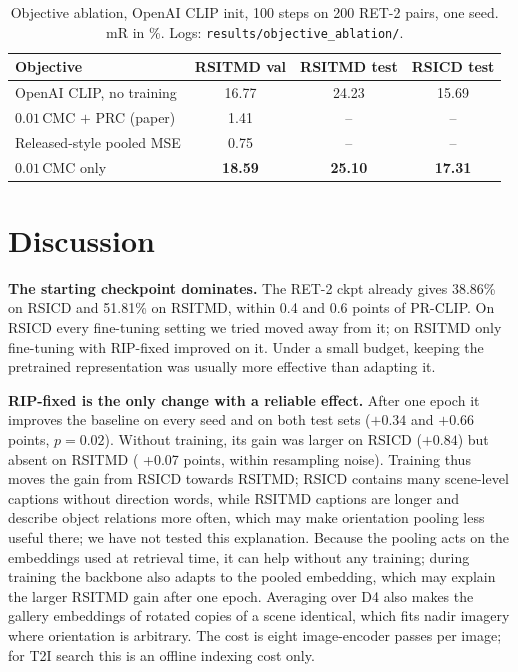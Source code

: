 \documentclass[conference]{IEEEtran}
\begin{document}
\begin{table}[t]
\centering
\caption{Objective ablation, OpenAI CLIP init, 100 steps on 200 RET-2 pairs, one seed. mR in \%. Logs: \texttt{results/objective\_ablation/}.}
\label{tab:objective}
\footnotesize
\begin{tabular}{@{}lccc@{}}
\toprule
Objective & RSITMD val & RSITMD test & RSICD test \\
\midrule
OpenAI CLIP, no training & 16.77 & 24.23 & 15.69 \\
$0.01\,$CMC $+$ PRC (paper) & 1.41 & -- & -- \\
Released-style pooled MSE & 0.75 & -- & -- \\
$0.01\,$CMC only & \textbf{18.59} & \textbf{25.10} & \textbf{17.31} \\
\bottomrule
\end{tabular}
\end{table}

\section{Discussion}
\textbf{The starting checkpoint dominates.} The RET-2 ckpt already gives 38.86\% on RSICD and 51.81\% on RSITMD, within 0.4 and 0.6 points of PR-CLIP. On RSICD every fine-tuning setting we tried moved away from it; on RSITMD only fine-tuning with RIP-fixed improved on it. Under a small budget, keeping the pretrained representation was usually more effective than adapting it.

\textbf{RIP-fixed is the only change with a reliable effect.} After one epoch it improves the baseline on every seed and on both test sets ($+0.34$ and $+0.66$ points, $p=0.02$). Without training, its gain was larger on RSICD ($+0.84$) but absent on RSITMD ( +0.07 points, within resampling noise). Training thus moves the gain from RSICD towards RSITMD; RSICD contains many scene-level captions without direction words, while RSITMD captions are longer and describe object relations more often, which may make orientation pooling less useful there; we have not tested this explanation. Because the pooling acts on the embeddings used at retrieval time, it can help without any training; during training the backbone also adapts to the pooled embedding, which may explain the larger RSITMD gain after one epoch. Averaging over D4 also makes the gallery embeddings of rotated copies of a scene identical, which fits nadir imagery where orientation is arbitrary. The cost is eight image-encoder passes per image; for T2I search this is an offline indexing cost only.
\end{document}
